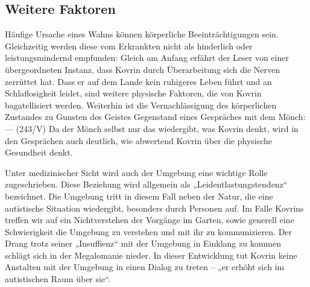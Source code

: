 \documentclass{../../sem_paper}
\begin{document}
\subsection{Weitere Faktoren}
Häufige Ursache eines Wahns können körperliche Beeinträchtigungen sein. Gleichzeitig
werden diese vom Erkrankten nicht als hinderlich oder leistungsmindernd empfunden\autocite[85]{avenarius}: Gleich am
Anfang erfährt der Leser von einer übergeordneten Instanz, dass Kovrin durch Überarbeitung sich die
Nerven zerrüttet hat. Dass er auf dem Lande kein ruhigeres Leben führt und an Schlaflosigkeit
leidet, sind weitere physische Faktoren, die von Kovrin bagatellisiert werden. Weiterhin ist die
Vernachlässigung des körperlichen Zustandes zu Gunsten des Geistes Gegenstand eines Gespräches
mit dem Mönch: — (243/V) Da der Mönch selbst nur das
wiedergibt, was Kovrin denkt, wird in den Gesprächen auch deutlich, wie abwertend Kovrin über
die physische Gesundheit denkt.

Unter medizinischer Sicht wird auch der Umgebung eine wichtige Rolle zugeschrieben. Diese
Beziehung wird allgemein als „Leidentlastungstendenz“ bezeichnet. Die Umgebung tritt in diesem
Fall neben der Natur, die eine autistische Situation wiedergibt, besonders durch Personen auf. Im
Falle Kovrins treffen wir auf ein Nichtverstehen der Vorgänge im Garten, sowie generell eine
Schwierigkeit die Umgebung zu verstehen und mit ihr zu kommunizieren. Der Drang trotz seiner
„Insuffienz“ mit der Umgebung in Einklang zu kommen schlägt sich in der Megalomanie nieder. In
dieser Entwicklung tut Kovrin keine Anstalten mit der Umgebung in einen Dialog zu treten -- „er
erhöht sich im autistischen Raum über sie“\autocite[84]{avenarius}.
\end{document}
